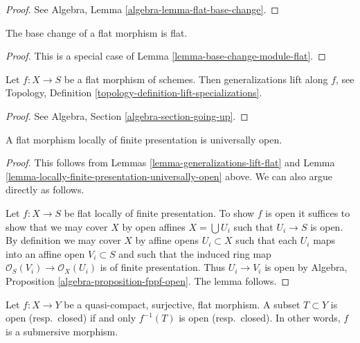 \begin{proof}
See Algebra, Lemma \ref{algebra-lemma-flat-base-change}.
\end{proof}

\begin{lemma}
\label{lemma-base-change-flat}
The base change of a flat morphism is flat.
\end{lemma}

\begin{proof}
This is a special case of Lemma \ref{lemma-base-change-module-flat}.
\end{proof}

\begin{lemma}
\label{lemma-generalizations-lift-flat}
Let $f : X \to S$ be a flat morphism of schemes.
Then generalizations lift along $f$, see
Topology, Definition \ref{topology-definition-lift-specializations}.
\end{lemma}

\begin{proof}
See Algebra, Section \ref{algebra-section-going-up}.
\end{proof}

\begin{lemma}
\label{lemma-fppf-open}
A flat morphism locally of finite presentation is universally open.
\end{lemma}

\begin{proof}
This follows from Lemmas \ref{lemma-generalizations-lift-flat} and
Lemma \ref{lemma-locally-finite-presentation-universally-open} above.
We can also argue directly as follows.

\medskip\noindent
Let $f : X \to S$ be flat locally of finite presentation.
To show $f$ is open it suffices to show that we may cover
$X$ by open affines $X = \bigcup U_i$ such that $U_i \to S$
is open. By definition we may cover $X$ by
affine opens $U_i \subset X$ such that each $U_i$ maps
into an affine open $V_i \subset S$ and such that
the induced ring map $\mathcal{O}_S(V_i) \to \mathcal{O}_X(U_i)$ is
of finite presentation. Thus $U_i \to V_i$ is open by
Algebra, Proposition \ref{algebra-proposition-fppf-open}.
The lemma follows.
\end{proof}

\begin{lemma}
\label{lemma-fpqc-quotient-topology}
Let $f : X \to Y$ be a quasi-compact, surjective, flat morphism.
A subset $T \subset Y$ is open (resp.\ closed) if and only
$f^{-1}(T)$ is open (resp.\ closed). In other words, $f$ is
a submersive morphism.
\end{lemma}

